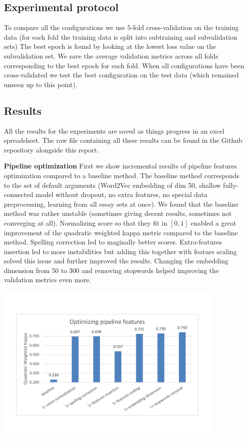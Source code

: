 \documentclass[a4paper,12pt,english]{article}
\begin{document}
\subsection{Experimental protocol}
To compare all the configurations we use 5-fold cross-validation on the training data (for each fold the training data is split into subtraining and subvalidation sets)
The best epoch is found by looking at the lowest loss value on the subvalidation set.
We save the average validation metrics across all folds corresponding to the best epoch for each fold.
When all configurations have been cross-validated we test the best configuration on the test data (which remained unseen up to this point).

\subsection{Results}
All the results for the experiments are saved as things progress in an excel spreadsheet. The raw file containing all these results can be found in the Github repository alongside this report.

\textbf{Pipeline optimization} First we show incremental results of pipeline features optimization compared to a baseline method. The baseline method corresponds to the set of default arguments (Word2Vec embedding of dim 50, shallow fully-connected model without dropout, no extra features, no special data preprocessing, learning from all essay sets at once). We found that the baseline method was rather unstable (sometimes giving decent results, sometimes not converging at all). Normalizing score so that they fit in $[0, 1]$ enabled a great improvement of the quadratic weighted kappa metric compared to the baseline method. Spelling correction led to maginally better scores. Extra-features insertion led to more instabilities but adding this together with feature scaling solved this issue and further improved the results. Changing the embedding dimension from 50 to 300 and removing stopwords helped improving the validation metrics even more.

\begin{center}
\vspace*{-1.5cm}
\includegraphics[width=0.85\textwidth]{fig/opt_pip_feat.pdf}
\vspace*{-1.5cm}
\end{center}
\end{document}
